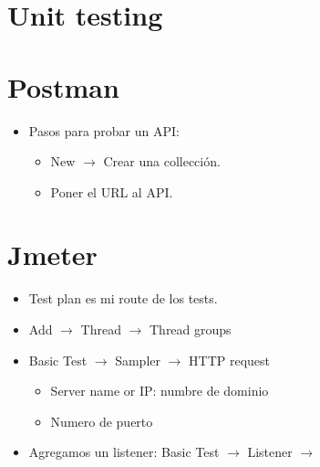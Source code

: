 \section{Unit testing}

\section{Postman}
\begin{itemize}
 \item Pasos para probar un API:
    \begin{itemize}[label=$\downarrow$]
        \item New $\rightarrow$ Crear una collección.
        \item Poner el URL al API.
    \end{itemize}
\end{itemize}

\section{Jmeter}
\begin{itemize}[label=$\downarrow$]
    \item Test plan es mi route de los tests.
    \item Add $\rightarrow$ Thread $\rightarrow$ Thread groups
    \item Basic Test $\rightarrow$ Sampler $\rightarrow$ HTTP request
        \begin{itemize}[label=$\downarrow$]
            \item Server name or IP: numbre de dominio 
            \item Numero de puerto 
        \end{itemize}
    \item Agregamos un listener:
        Basic Test $\rightarrow$ Listener $\rightarrow$ 
        
\end{itemize}
